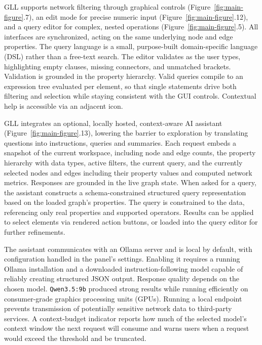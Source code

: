 GLL supports network filtering through graphical controls (Figure~\ref{fig:main-figure}.7), an edit mode for precise numeric input (Figure~\ref{fig:main-figure}.12), and a query editor for complex, nested operations (Figure~\ref{fig:main-figure}.5). All interfaces are synchronized, acting on the same underlying node and edge properties. The query language is a small, purpose-built domain-specific language (DSL) rather than a free-text search. The editor validates as the user types, highlighting empty clauses, missing connectors, and unmatched brackets. Validation is grounded in the property hierarchy. Valid queries compile to an expression tree evaluated per element, so that single statements drive both filtering and selection while staying consistent with the GUI controls. Contextual help is accessible via an adjacent icon.

GLL integrates an optional, locally hosted, context-aware AI assistant (Figure~\ref{fig:main-figure}.13), lowering the barrier to exploration by translating questions into instructions, queries and summaries. Each request embeds a snapshot of the current workspace, including node and edge counts, the property hierarchy with data types, active filters, the current query, and the currently selected nodes and edges including their property values and computed network metrics. Responses are grounded in the live graph state. When asked for a query, the assistant constructs a schema-constrained structured query representation based on the loaded graph's properties. The query is constrained to the data, referencing only real properties and supported operators. Results can be applied to select elements via rendered action buttons, or loaded into the query editor for further refinements.

The assistant communicates with an Ollama server and is local by default, with configuration handled in the panel's settings. Enabling it requires a running Ollama installation and a downloaded instruction-following model capable of reliably creating structured JSON output. Response quality depends on the chosen model. \texttt{Qwen3.5:9b} produced strong results while running efficiently on consumer-grade graphics processing units (GPUs)\citep{teamQwen35OmniTechnicalReport2026}. Running a local endpoint prevents transmission of potentially sensitive network data to third-party services. A context-budget indicator reports how much of the selected model's context window the next request will consume and warns users when a request would exceed the threshold and be truncated.

